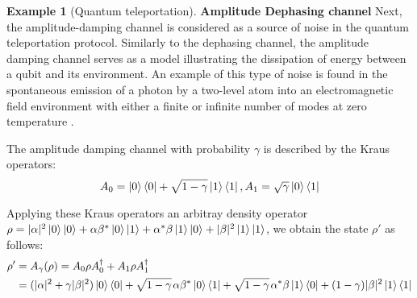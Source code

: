 \documentclass[10pt,a4paper]{amsart}
\theoremstyle{definition}
\theoremstyle{definition}
\newtheorem{example}[definition]{Example}
\theoremstyle{definition}
\theoremstyle{definition}
\theoremstyle{definition}
\theoremstyle{definition}
\begin{document}
\begin{example}[Quantum teleportation]
     \textbf{Amplitude Dephasing channel}
     Next, the amplitude-damping channel is considered as a source of noise in the quantum teleportation protocol. Similarly to the dephasing channel, the amplitude damping channel serves as a model illustrating the dissipation of energy between a qubit and its environment. An example of this type of noise is found in the spontaneous emission of a photon by a two-level atom into an electromagnetic field environment with either a finite or infinite number of modes at zero temperature \cite{salles2008experimental, Wang_2011}.

     The amplitude damping channel with probability $\gamma$ is described by the Kraus operators:
\begin{equation*}
     A_{0}= \ket{0} \bra{0} + \sqrt{1-\gamma} \ket{1} \bra{1} ,  A_{1}= \sqrt{\gamma} \ket{0} \bra{1}
\end{equation*}

Applying these Kraus operators an arbitray density operator $\rho=|\alpha|^{2} \ket{0} \ket{0} + \alpha \beta^{*} \ket{0} \ket{1} + \alpha^{*} \beta \ket{1} \ket{0} + |\beta|^{2} \ket{1} \ket{1}$, we obtain the state $\rho'$ as follows:
\begin{align*}
     \rho' & = A_\gamma(\rho) =  A_{0} \rho A_{0}^{\dag} + A_{1} \rho A_{1}^{\dag} \\
     & = (|\alpha|^{2} + \gamma |\beta|^{2}) \ket{0}\bra{0} + \sqrt{1-\gamma} \hspace{1pt} \alpha \beta^{*} \ket{0}\bra{1} + \sqrt{1-\gamma} \hspace{1pt} \alpha^{*} \beta \ket{1}\bra{0} + (1-\gamma) |\beta|^{2} \ket{1}\bra{1}
\end{align*}


\end{example}
\end{document}
